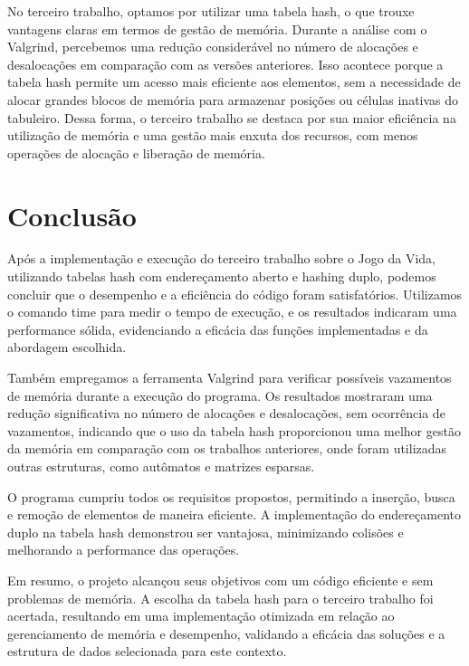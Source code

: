 \documentclass{article}
\begin{document}
\par No terceiro trabalho, optamos por utilizar uma tabela hash, o que trouxe vantagens claras em termos de gestão de memória. Durante a análise com o Valgrind, percebemos uma redução considerável no número de alocações e desalocações em comparação com as versões anteriores. Isso acontece porque a tabela hash permite um acesso mais eficiente aos elementos, sem a necessidade de alocar grandes blocos de memória para armazenar posições ou células inativas do tabuleiro. Dessa forma, o terceiro trabalho se destaca por sua maior eficiência na utilização de memória e uma gestão mais enxuta dos recursos, com menos operações de alocação e liberação de memória.

\section{Conclusão} 
\par Após a implementação e execução do terceiro trabalho sobre o Jogo da Vida, utilizando tabelas hash com endereçamento aberto e hashing duplo, podemos concluir que o desempenho e a eficiência do código foram satisfatórios. Utilizamos o comando time para medir o tempo de execução, e os resultados indicaram uma performance sólida, evidenciando a eficácia das funções implementadas e da abordagem escolhida.

\par Também empregamos a ferramenta Valgrind para verificar possíveis vazamentos de memória durante a execução do programa. Os resultados mostraram uma redução significativa no número de alocações e desalocações, sem ocorrência de vazamentos, indicando que o uso da tabela hash proporcionou uma melhor gestão da memória em comparação com os trabalhos anteriores, onde foram utilizadas outras estruturas, como autômatos e matrizes esparsas.

\par O programa cumpriu todos os requisitos propostos, permitindo a inserção, busca e remoção de elementos de maneira eficiente. A implementação do endereçamento duplo na tabela hash demonstrou ser vantajosa, minimizando colisões e melhorando a performance das operações.

\par Em resumo, o projeto alcançou seus objetivos com um código eficiente e sem problemas de memória. A escolha da tabela hash para o terceiro trabalho foi acertada, resultando em uma implementação otimizada em relação ao gerenciamento de memória e desempenho, validando a eficácia das soluções e a estrutura de dados selecionada para este contexto.
\end{document}

